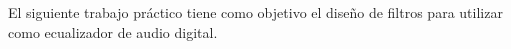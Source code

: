 	El siguiente trabajo práctico tiene como objetivo el diseño de filtros para utilizar como ecualizador de audio digital.


